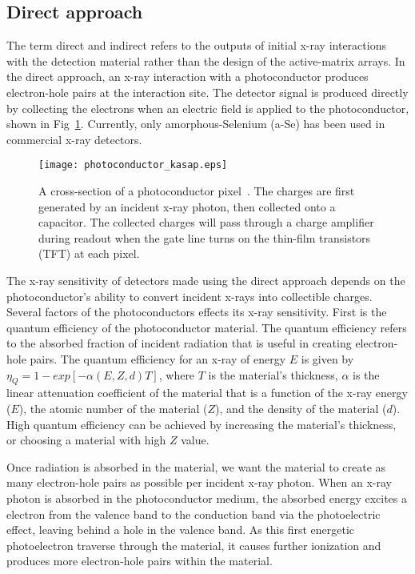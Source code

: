 \subsection{Direct approach}
The term direct and indirect refers to the outputs of initial x-ray interactions with the detection material rather than the design of the active-matrix arrays.  In the direct approach, an x-ray interaction with a photoconductor produces electron-hole pairs at the interaction site.  The detector signal is produced directly by collecting the electrons when an electric field is applied to the photoconductor, shown in Fig~\ref{fig:photoconductor_cross_section}.  Currently, only amorphous-Selenium (a-Se) has been used in commercial x-ray detectors.
%
\begin{figure}[ht]
\centering
\texttt{[image: photoconductor\_kasap.eps]}
\caption{A cross-section of a photoconductor pixel~\citep{kasap2006}.  The charges are first generated by an incident x-ray photon, then collected onto a capacitor.  The collected charges will pass through a charge amplifier during readout when the gate line turns on the thin-film transistors (TFT) at each pixel.}
\label{fig:photoconductor_cross_section}
\end{figure}

The x-ray sensitivity of detectors made using the direct approach depends on the photoconductor's ability to convert incident x-rays into collectible charges.  Several factors of the photoconductors effects its x-ray sensitivity.  First is the quantum efficiency of the photoconductor material.  The quantum efficiency refers to the absorbed fraction of incident radiation that is useful in creating electron-hole pairs.  The quantum efficiency for an x-ray of energy $E$ is given by $\eta_Q = 1 - exp[-\alpha (E, Z, d) T]$, where $T$ is the material's thickness, $\alpha$ is the linear attenuation coefficient of the material that is a function of the x-ray energy ($E$), the atomic number of the material ($Z$), and the density of the material ($d$).  High quantum efficiency can be achieved by increasing the material's thickness, or choosing a material with high $Z$ value.  

Once radiation is absorbed in the material, we want the material to create as many electron-hole pairs as possible per incident x-ray photon.  When an x-ray photon is absorbed in the photoconductor medium, the absorbed energy excites a electron from the valence band to the conduction band via the photoelectric effect, leaving behind a hole in the valence band.  As this first energetic photoelectron traverse through the material, it causes further ionization and produces more electron-hole pairs within the material.  

